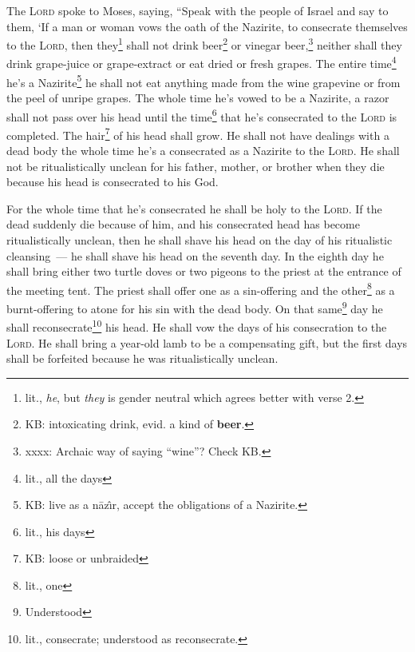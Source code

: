 
\begin{inparaenum}
     The \textsc{Lord} spoke to Moses, saying,%
     ``Speak with the people of Israel and say to them, `If a man or woman vows the oath of the Nazirite, to consecrate themselves to the \textsc{Lord},%
     then they\footnote{lit., \textit{he}, but \textit{they} is gender neutral which agrees better with verse 2.} shall not drink beer\footnote{KB: intoxicating drink, evid\@. a kind of \textbf{beer}.} or vinegar beer,\footnote{xxxx: Archaic way of saying ``wine''? Check KB.} neither shall they drink grape-juice or grape-extract or eat dried or fresh grapes.%
     The entire time\footnote{lit., all the days} he's a Nazirite\footnote{KB: live as a n\=az\^\i{}r, accept the obligations of a Nazirite.} he shall not eat anything made from the wine grapevine or from the peel of unripe grapes.%
     The whole time he's vowed to be a Nazirite, a razor shall not pass over his head until the time\footnote{lit., his days} that he's consecrated to the \textsc{Lord} is completed. The hair\footnote{KB: loose or unbraided} of his head shall grow.%
     He shall not have dealings with a dead body the whole time he's a consecrated as a Nazirite to the \textsc{Lord}.%
     He shall not be ritualistically unclean for his father, mother, or brother when they die because his head is consecrated to his God.%
    
     For the whole time that he's consecrated he shall be holy to the \textsc{Lord}.%
     If the dead suddenly die because of him, and his consecrated head has become ritualistically unclean, then he shall shave his head on the day of his ritualistic cleansing~--- he shall shave his head on the seventh day.%
     In the eighth day he shall bring either two turtle doves or two pigeons to the priest at the entrance of the meeting tent.%
     The priest shall offer one as a sin-offering and the other\footnote{lit., one} as a burnt-offering to atone for his sin with the dead body. On that same\footnote{Understood} day he shall reconsecrate\footnote{lit., consecrate; understood as reconsecrate.} his head.%
     He shall vow the days of his consecration to the \textsc{Lord}. He shall bring a year-old lamb to be a compensating gift, but the first days shall be forfeited because he was ritualistically unclean.%
    

\end{inparaenum}

